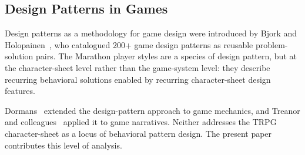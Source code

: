 \subsection{Design Patterns in Games}

Design patterns as a methodology for game design were introduced by Bjork and
Holopainen~\cite{bjork2005patterns}, who catalogued 200+ game design patterns as
reusable problem-solution pairs. The Marathon player styles are a species of design
pattern, but at the character-sheet level rather than the game-system level: they
describe recurring behavioral solutions enabled by recurring character-sheet design
features.

Dormans~\cite{dormans2012engineering} extended the design-pattern approach to game
mechanics, and Treanor and colleagues~\cite{treanor2012game} applied it to game
narratives. Neither addresses the TRPG character-sheet as a locus of behavioral
pattern design. The present paper contributes this level of analysis.
